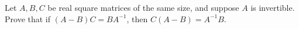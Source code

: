 Let \(A,B,C\) be real square matrices of the same size, and suppose \(A\) is invertible.
Prove that if \((A-B)C=BA^{-1}\), then \(C(A-B)=A^{-1}B\).